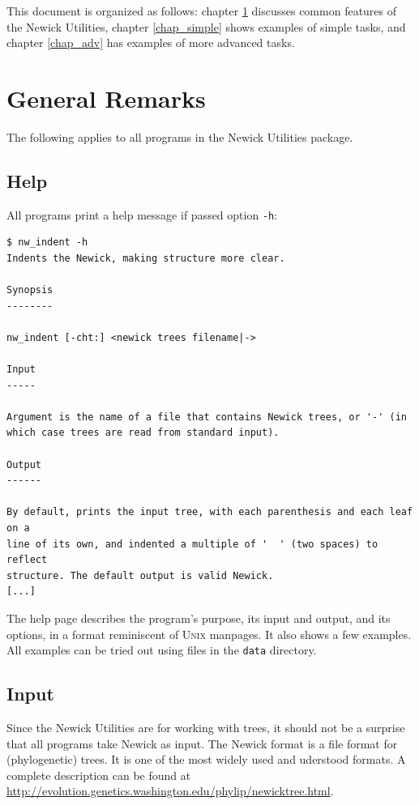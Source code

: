 \documentclass[a4paper,10pt]{report}
\newcommand{\nutils}{Newick Utilities}
\newcommand{\unix}{\textsc{Unix}}
\theoremstyle{definition}
\begin{document}
This document is organized as follows: chapter \ref{chap_general} discusses common features of the \nutils, chapter \ref{chap_simple} shows examples of simple tasks, and chapter \ref{chap_adv} has examples of more advanced tasks. 

\chapter{General Remarks}
\label{chap_general}

The following applies to all programs in the \nutils{} package.

\section{Help}
\label{sect_help}

All programs print a help message if passed option \texttt{-h}:

\begin{samepage}
\begin{verbatim}
$ nw_indent -h
Indents the Newick, making structure more clear.

Synopsis
--------

nw_indent [-cht:] <newick trees filename|->

Input
-----

Argument is the name of a file that contains Newick trees, or '-' (in
which case trees are read from standard input).

Output
------

By default, prints the input tree, with each parenthesis and each leaf on a
line of its own, and indented a multiple of '  ' (two spaces) to reflect
structure. The default output is valid Newick.
[...]
\end{verbatim}
\end{samepage}
The help page describes the program's purpose, its input and output, and its options, in a format reminiscent of \unix{} manpages. It also shows a few examples. All examples can be tried out using files in the \texttt{data} directory.

\section{Input}
\label{sect_input}

Since the \nutils{} are for working with trees, it should not be a surprise that all programs take Newick as input. The Newick format is a file format for (phylogenetic) trees. It is one of the most widely used and uderstood formats.
A complete description can be found at \url{http://evolution.genetics.washington.edu/phylip/newicktree.html}.
\end{document}
